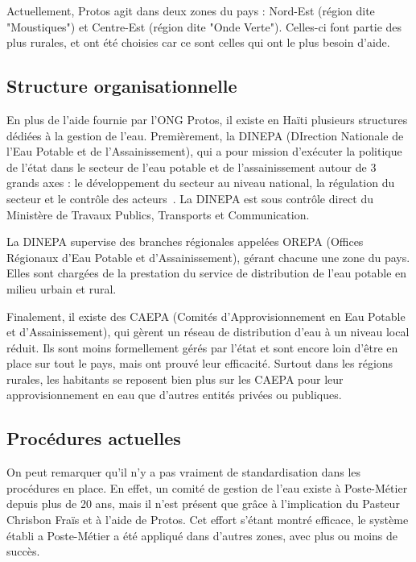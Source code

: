 \documentclass{EPL-master-thesis-covers-FR}
\begin{document}
    			Actuellement, Protos agit dans deux zones du pays : Nord-Est (région dite "Moustiques") et Centre-Est (région dite "Onde Verte"). Celles-ci font partie des plus rurales, et ont été choisies car ce sont celles qui ont le plus besoin d'aide.

			\subsection*{Structure organisationnelle}
				\label{sec:structure_haiti}


    			En plus de l'aide fournie par l'ONG Protos, il existe en Haïti plusieurs structures dédiées à la gestion de l'eau. Premièrement, la DINEPA (DIrection Nationale de l'Eau Potable et de l'Assainissement), qui a pour mission d’exécuter la politique de l’état dans le secteur de l’eau potable et de l’assainissement autour de 3 grands axes : le développement du secteur au niveau national, la régulation du secteur et le contrôle des acteurs~\cite{ref:dinepa}. La DINEPA est sous contrôle direct du Ministère de Travaux Publics, Transports et Communication.

    			La DINEPA supervise des branches régionales appelées OREPA (Offices Régionaux d'Eau Potable et d'Assainissement), gérant chacune une zone du pays. Elles sont chargées de la prestation du service de distribution de l'eau potable en milieu urbain et rural.

    			Finalement, il existe des CAEPA (Comités d’Approvisionnement en Eau Potable et d'Assainissement), qui gèrent un réseau de distribution d'eau à un niveau local réduit. Ils sont moins formellement gérés par l'état et sont encore loin d'être en place sur tout le pays, mais ont prouvé leur efficacité. Surtout dans les régions rurales, les habitants se reposent bien plus sur les CAEPA pour leur approvisionnement en eau que d'autres entités privées ou publiques.



			\subsection*{Procédures actuelles}
				\label{sec:procedures_actuelles}

    			On peut remarquer qu'il n'y a pas vraiment de standardisation dans les procédures en place. En effet, un comité de gestion de l'eau existe à Poste-Métier depuis plus de 20 ans, mais il n'est présent que grâce à l'implication du Pasteur Chrisbon Fraïs et à l'aide de Protos. Cet effort s'étant montré efficace, le système établi a Poste-Métier a été appliqué dans d'autres zones, avec plus ou moins de succès.
\end{document}
